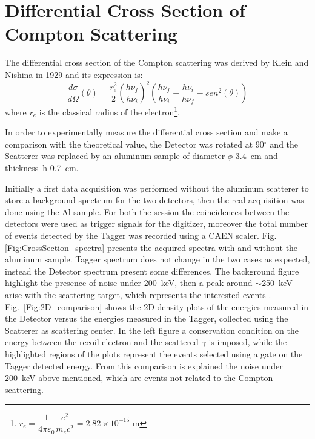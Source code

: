 \newpage
\section*{Differential Cross Section of Compton Scattering}
The differential cross section of the Compton scattering was derived by Klein and Nishina in 1929 and its expression is:
\begin{equation*}
	\frac{d\sigma}{d\Omega}(\theta)=\frac{r_e ^2}{2}\left(\frac{h \nu_f}{h \nu_i}\right)^2\left(\frac{h \nu_f}{h \nu_i}+\frac{h \nu_i}{h \nu_f}-sen^2(\theta)\right)
\end{equation*}
where $r_e$ is the classical radius of the electron\footnote{$r_e =\dfrac{1}{4\pi \varepsilon_0}\dfrac{e^2}{m_ec^2} =2.82 \times 10^{-15}$ m}.

\medskip

In order to experimentally measure the differential cross section and make a comparison with the theoretical value, the Detector was rotated at 90$^\circ$ and the Scatterer was replaced by an aluminum sample of  diameter $\phi$ 3.4~cm and thickness~h 0.7~cm.  

Initially  a first data acquisition was performed without the aluminum scatterer to store a background spectrum for the two detectors, then the real acquisition was done using the Al sample. For both the session the coincidences between the detectors were used as trigger signals for the digitizer, moreover the total number of events detected by the Tagger was recorded using a CAEN scaler. Fig.~ \ref{Fig:CrossSection_spectra} presents the acquired spectra with and without the aluminum sample. Tagger spectrum does not change in the two cases as expected, instead the Detector spectrum present some differences. The background figure highlight the presence of noise under 200~keV, then a peak around $\sim$250~keV arise with the scattering target, which represents the interested events . Fig.~\ref{Fig:2D_comparison} shows the 2D density plots of the energies measured in the Detector versus the energies measured in the Tagger, collected using the Scatterer as scattering center. In the left figure a conservation condition on the energy between the recoil electron and the scattered $\gamma$ is imposed, while the highlighted regions of the plots represent the events selected using a gate on the Tagger detected energy.  From this comparison is explained the noise under 200~keV above mentioned, which are events not related to the Compton scattering. 

